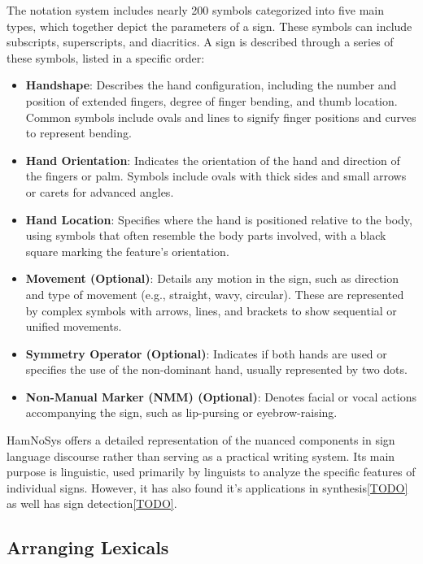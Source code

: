 The notation system includes nearly 200 symbols categorized into five main types, which together depict the parameters of a sign. These symbols can include subscripts, superscripts, and diacritics. A sign is described through a series of these symbols, listed in a specific order:

\begin{itemize}
    \item \textbf{Handshape}: Describes the hand configuration, including the number and position of extended fingers, degree of finger bending, and thumb location. Common symbols include ovals and lines to signify finger positions and curves to represent bending.
    \item \textbf{Hand Orientation}: Indicates the orientation of the hand and direction of the fingers or palm. Symbols include ovals with thick sides and small arrows or carets for advanced angles.
    \item \textbf{Hand Location}: Specifies where the hand is positioned relative to the body, using symbols that often resemble the body parts involved, with a black square marking the feature's orientation.
    \item \textbf{Movement (Optional)}: Details any motion in the sign, such as direction and type of movement (e.g., straight, wavy, circular). These are represented by complex symbols with arrows, lines, and brackets to show sequential or unified movements.
    \item \textbf{Symmetry Operator (Optional)}: Indicates if both hands are used or specifies the use of the non-dominant hand, usually represented by two dots.
    \item \textbf{Non-Manual Marker (NMM) (Optional)}: Denotes facial or vocal actions accompanying the sign, such as lip-pursing or eyebrow-raising.
\end{itemize}

HamNoSys offers a detailed representation of the nuanced components in sign language discourse rather than serving as a practical writing system. Its main purpose is linguistic, used primarily by linguists to analyze the specific features of individual signs. However, it has also found it's applications in synthesis\ref{TODO} as well has sign detection\ref{TODO}.


\subsection{Arranging Lexicals}

